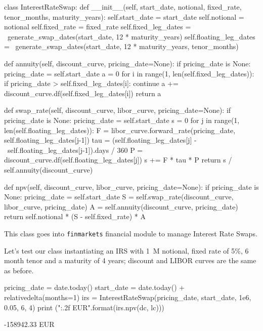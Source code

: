 \begin{ipython}
class InterestRateSwap:
    def __init__(self, start_date, notional,
                 fixed_rate, tenor_months, maturity_years):
        self.start_date = start_date
        self.notional = notional
        self.fixed_rate = fixed_rate
        self.fixed_leg_dates = \
            generate_swap_dates(start_date, 12 * maturity_years)
        self.floating_leg_dates = \
            generate_swap_dates(start_date, 12 * maturity_years, tenor_months)
    
    def annuity(self, discount_curve, pricing_date=None):
        if pricing_date is None:
            pricing_date = self.start_date
        a = 0
        for i in range(1, len(self.fixed_leg_dates)):
            if pricing_date > self.fixed_leg_dates[i]:
                continue
            a += discount_curve.df(self.fixed_leg_dates[i])
        return a

    def swap_rate(self, discount_curve, libor_curve, pricing_date=None):
        if pricing_date is None:
            pricing_date = self.start_date
        s = 0
        for j in range(1, len(self.floating_leg_dates)):
            F = libor_curve.forward_rate(pricing_date, self.floating_leg_dates[j-1])
            tau = (self.floating_leg_dates[j] - \
                self.floating_leg_dates[j-1]).days / 360 
            P = discount_curve.df(self.floating_leg_dates[j])
            s += F * tau * P
        return s / self.annuity(discount_curve)

    def npv(self, discount_curve, libor_curve, pricing_date=None):
        if pricing_date is None:
            pricing_date = self.start_date
        S = self.swap_rate(discount_curve, libor_curve, pricing_date)
        A = self.annuity(discount_curve, pricing_date)
        return self.notional * (S - self.fixed_rate) * A
\end{ipython}

\begin{finmarkets}
This class goes into \texttt{finmarkets} financial module to manage Interest Rate Swaps.
\end{finmarkets}
Let's test our class instantiating an IRS with 1~M notional, fixed rate of 5\%, 6 month tenor and a maturity of 4 years; discount and LIBOR curves are the same as before.

\begin{ipython}
pricing_date = date.today()
start_date = date.today() + relativedelta(months=1)
irs = InterestRateSwap(pricing_date, start_date, 
                       1e6, 0.05, 6, 4)
print ("{:.2f} EUR".format(irs.npv(dc, lc)))
\end{ipython}
\begin{ioutput}
-158942.33 EUR
\end{ioutput}

